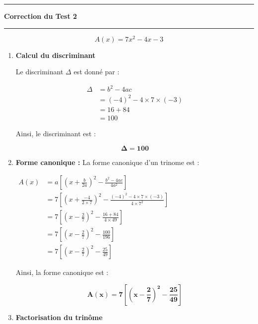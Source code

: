 \documentclass[a4paper,12pt]{article}
\begin{document}
\hrule %
\begin{center}
    {\Large \textbf{Correction du Test 2}}
\end{center}
\hrule

\[
    A(x) = 7x^2 - 4x - 3
\]

\begin{enumerate}
\item \textbf{Calcul du discriminant} 
 
Le discriminant \(\Delta\) est donné par :

\[
\begin{aligned}
 \Delta &= b^2 - 4ac \\
        &= (-4)^2 - 4 \times 7 \times (-3) \\
        &= 16 + 84 \\
        &= 100
\end{aligned}
\]

Ainsi, le discriminant est : 

\begin{resultbox}
    \[
    \mathbf{\Delta = 100}
    \]
\end{resultbox}
    
    \item \textbf{Forme canonique :} \newline
    La forme canonique d'un trinome est :
    
$
\begin{aligned}
    A(x)&= a \left[ \left(x + \frac{b}{2a}\right)^2 - \frac{b^{2}-4ac}{4a^{2}}\right]\\
				&= 7 \left[ \left( x + \frac{-4}{2 \times 7} \right)^2 - \frac{(-4)^2 - 4 \times 7 \times (-3)}{4 \times 7^2} \right] \\
         &= 7 \left[ \left( x - \frac{2}{7} \right)^2 - \frac{16 + 84}{4 \times 49} \right] \\
         &= 7 \left[ \left( x - \frac{2}{7} \right)^2 - \frac{100}{196} \right] \\
         &= 7 \left[ \left( x - \frac{2}{7} \right)^2 - \frac{25}{49} \right]
\end{aligned}
$

Ainsi, la forme canonique est :

\begin{resultbox}
    \[
    \mathbf{A(x) = 7 \left[\left( x - \frac{2}{7} \right)^2 - \frac{25}{49}\right]}
    \]
\end{resultbox}
    
\item \textbf{Factorisation du trinôme}  


\end{enumerate}
\end{document}
